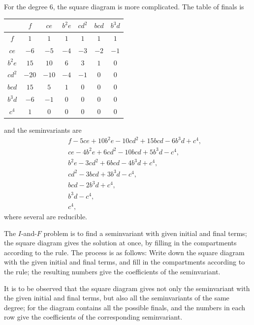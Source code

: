 \documentclass[11pt,a4paper]{book}
\begin{document}
{{{\setcounter{art}{42}
\begin{art}
For the degree 6, the square diagram is more complicated. The table of finals is
\begin{center}
\begin{tabular}{c|cccccc}
 & $f$ & $ce$ & $b^{2}e$ & $cd^{2}$ & $bcd$ & $b^{3}d$ \\
\hline
$f$ & $1$ & $1$ & $1$ & $1$ & $1$ & $1$ \\
$ce$ & $-6$ & $-5$ & $-4$ & $-3$ & $-2$ & $-1$ \\
$b^{2}e$ & $15$ & $10$ & $6$ & $3$ & $1$ & $0$ \\
$cd^{2}$ & $-20$ & $-10$ & $-4$ & $-1$ & $0$ & $0$ \\
$bcd$ & $15$ & $5$ & $1$ & $0$ & $0$ & $0$ \\
$b^{3}d$ & $-6$ & $-1$ & $0$ & $0$ & $0$ & $0$ \\
$c^{4}$ & $1$ & $0$ & $0$ & $0$ & $0$ & $0$ \\
\end{tabular}
\end{center}
and the seminvariants are
\begin{align*}
&\phantom{+}f - 5ce + 10b^{2}e - 10cd^{2} + 15bcd - 6b^{3}d + c^{4},\\
&\phantom{+}ce - 4b^{2}e + 6cd^{2} - 10bcd + 5b^{3}d - c^{4},\\
&\phantom{+}b^{2}e - 3cd^{2} + 6bcd - 4b^{3}d + c^{4},\\
&\phantom{+}cd^{2} - 3bcd + 3b^{3}d - c^{4},\\
&\phantom{+}bcd - 2b^{3}d + c^{4},\\
&\phantom{+}b^{3}d - c^{4},\\
&\phantom{+}c^{4},
\end{align*}
where several are reducible.
\end{art}

\setcounter{art}{43}
\begin{art}
The $I$-and-$F$ problem is to find a seminvariant with given initial and final terms; the square diagram gives the solution at once, by filling in the compartments according to the rule. The process is as follows: Write down the square diagram with the given initial and final terms, and fill in the compartments according to the rule; the resulting numbers give the coefficients of the seminvariant.
\end{art}

\setcounter{art}{44}
\begin{art}
It is to be observed that the square diagram gives not only the seminvariant with the given initial and final terms, but also all the seminvariants of the same degree; for the diagram contains all the possible finals, and the numbers in each row give the coefficients of the corresponding seminvariant.
\end{art}

}}}
\end{document}
